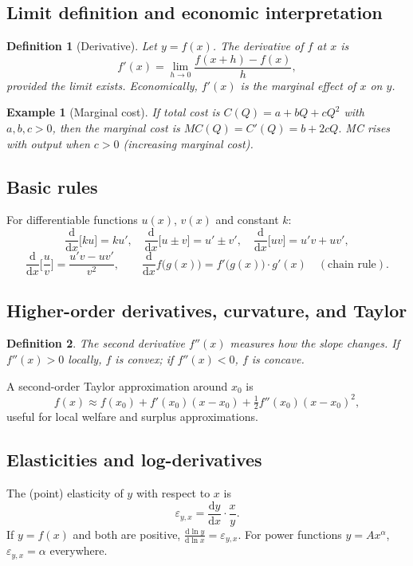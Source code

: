 \documentclass[11pt]{article}
\newcommand{\dtotal}[2]{\frac{\mathrm{d} #1}{\mathrm{d} #2}}
\newtheorem{definition}{Definition}
\newtheorem{example}{Example}
\begin{document}
\subsection{Limit definition and economic interpretation}
\begin{definition}[Derivative]
Let \(y=f(x)\). The derivative of \(f\) at \(x\) is
\[
f'(x)=\lim_{h\to 0}\frac{f(x+h)-f(x)}{h},
\]
provided the limit exists. Economically, \(f'(x)\) is the \emph{marginal} effect of \(x\) on \(y\).
\end{definition}

\begin{example}[Marginal cost]
If total cost is \(C(Q)=a+bQ+cQ^2\) with \(a,b,c>0\), then the marginal cost is
\(
MC(Q)=C'(Q)=b+2cQ.
\)
MC rises with output when \(c>0\) (increasing marginal cost).
\end{example}

\subsection{Basic rules}
For differentiable functions \(u(x)\), \(v(x)\) and constant \(k\):
\[
\frac{\mathrm{d}}{\mathrm{d}x}\big[ku\big] = ku',\quad
\frac{\mathrm{d}}{\mathrm{d}x}\big[u\pm v\big] = u'\pm v',\quad
\frac{\mathrm{d}}{\mathrm{d}x}\big[uv\big]=u'v+uv',
\]
\[
\frac{\mathrm{d}}{\mathrm{d}x}\Big[\frac{u}{v}\Big]=\frac{u'v-uv'}{v^2},\qquad
\frac{\mathrm{d}}{\mathrm{d}x}f\!\big(g(x)\big)=f'\!\big(g(x)\big)\cdot g'(x) \quad(\text{chain rule}).
\]

\subsection{Higher-order derivatives, curvature, and Taylor}
\begin{definition}
The second derivative \(f''(x)\) measures how the slope changes. If \(f''(x)>0\) locally, \(f\) is \emph{convex}; if \(f''(x)<0\), \(f\) is \emph{concave}.
\end{definition}

A second-order Taylor approximation around \(x_0\) is
\[
f(x)\approx f(x_0)+f'(x_0)(x-x_0)+\tfrac12 f''(x_0)(x-x_0)^2,
\]
useful for local welfare and surplus approximations.

\subsection{Elasticities and log-derivatives}
The (point) elasticity of \(y\) with respect to \(x\) is
\[
\varepsilon_{y,x}=\frac{\mathrm{d}y}{\mathrm{d}x}\cdot\frac{x}{y}.
\]
If \(y=f(x)\) and both are positive, \(\dtotal{\ln y}{\ln x}=\varepsilon_{y,x}\). For power functions \(y=Ax^\alpha\), \(\varepsilon_{y,x}=\alpha\) everywhere.
\end{document}
